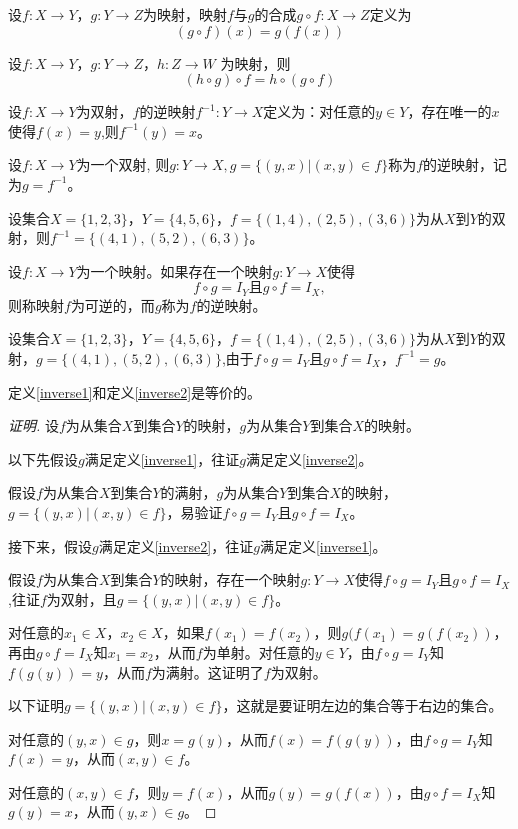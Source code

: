   \begin{Def}
    设$f:X\to Y$，$g:Y\to Z$为映射，映射$f$与$g$的合成$g\circ f:X\to Z$定义为\[(g\circ f)(x) = g(f(x))\]
  \end{Def}
\begin{Thm}
  设$f:X \to Y$，$g:Y\to Z$，$h:Z\to W$ 为映射，则 \[ (h \circ g) \circ f = h \circ (g \circ f) \]
\end{Thm}

  \begin{Def}
     设$f:X\to Y$为双射，$f$的逆映射$f^{-1}:Y\to X$定义为：对任意的$y\in Y$，存在唯一的$x$使得$f(x)=y$,则$f^{-1}(y)=x$。
   \end{Def}

   \begin{Def}\label{inverse1}
          设$f:X\to Y$为一个双射, 则$g:Y\to X, g=\{(y,x)|(x,y)\in f\}$称为$f$的逆映射，记为$g=f^{-1}$。
   \end{Def}
   \begin{Example}
     设集合$X=\{1,2,3\}$，$Y=\{4,5,6\}$，$f=\{(1,4),(2,5),(3,6)\}$为从$X$到$Y$的双射，则$f^{-1}=\{(4,1),(5,2),(6,3)\}$。
   \end{Example}
    \begin{Def}\label{inverse2}
     设$f:X\to Y$为一个映射。如果存在一个映射$g:Y\to X$使得\[f\circ g = I_{Y} \text{且} g\circ f = I_{X},\]则称映射$f$为可逆的，而$g$称为$f$的逆映射。
   \end{Def}
      \begin{Example}
     设集合$X=\{1,2,3\}$，$Y=\{4,5,6\}$，$f=\{(1,4),(2,5),(3,6)\}$为从$X$到$Y$的双射，$g=\{(4,1),(5,2),(6,3)\}$,由于$f\circ g = I_{Y}$且$ g\circ f = I_{X}$，$f^{-1}=g$。
   \end{Example}
\begin{Thm}
   定义\ref{inverse1}和定义\ref{inverse2}是等价的。
 \end{Thm}
 \begin{proof}[证明]
   设$f$为从集合$X$到集合$Y$的映射，$g$为从集合$Y$到集合$X$的映射。

   以下先假设$g$满足定义\ref{inverse1}，往证$g$满足定义\ref{inverse2}。

   假设$f$为从集合$X$到集合$Y$的满射，$g$为从集合$Y$到集合$X$的映射，$g=\{(y,x)|(x,y)\in f\}$，易验证$f\circ g = I_{Y}$且$g\circ f = I_{X}$。

   接下来，假设$g$满足定义\ref{inverse2}，往证$g$满足定义\ref{inverse1}。

   假设$f$为从集合$X$到集合$Y$的映射，存在一个映射$g:Y\to X$使得$f\circ g = I_{Y}$且$g\circ f = I_{X}$,往证$f$为双射，且$g=\{(y,x)|(x,y)\in f\}$。

   对任意的$x_1\in X$，$x_2\in X$，如果$f(x_1)=f(x_2)$，则$g(f(x_1)=g(f(x_2))$，再由$g\circ f = I_{X}$知$x_1=x_2$，从而$f$为单射。对任意的$y\in Y$，由$f\circ g = I_{Y}$知$f(g(y))=y$，从而$f$为满射。这证明了$f$为双射。

   以下证明$g=\{(y,x)|(x,y)\in f\}$，这就是要证明左边的集合等于右边的集合。

   对任意的$(y,x)\in g$，则$x=g(y)$，从而$f(x)=f(g(y))$，由$f\circ g = I_{Y}$知$f(x)=y$，从而$(x,y)\in f$。

   对任意的$(x,y)\in f$，则$y=f(x)$，从而$g(y)=g(f(x))$，由$g\circ f = I_{X}$知$g(y)=x$，从而$(y,x) \in g$。
 \end{proof}
